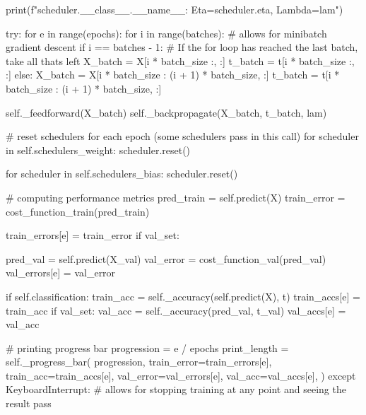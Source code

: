 \documentclass[%
oneside,                 %
final,                   %
10pt]{article}
\begin{document}
        print(f"{scheduler.__class__.__name__}: Eta={scheduler.eta}, Lambda={lam}")

        try:
            for e in range(epochs):
                for i in range(batches):
                    # allows for minibatch gradient descent
                    if i == batches - 1:
                        # If the for loop has reached the last batch, take all thats left
                        X_batch = X[i * batch_size :, :]
                        t_batch = t[i * batch_size :, :]
                    else:
                        X_batch = X[i * batch_size : (i + 1) * batch_size, :]
                        t_batch = t[i * batch_size : (i + 1) * batch_size, :]

                    self._feedforward(X_batch)
                    self._backpropagate(X_batch, t_batch, lam)

                # reset schedulers for each epoch (some schedulers pass in this call)
                for scheduler in self.schedulers_weight:
                    scheduler.reset()

                for scheduler in self.schedulers_bias:
                    scheduler.reset()

                # computing performance metrics
                pred_train = self.predict(X)
                train_error = cost_function_train(pred_train)

                train_errors[e] = train_error
                if val_set:
                    
                    pred_val = self.predict(X_val)
                    val_error = cost_function_val(pred_val)
                    val_errors[e] = val_error

                if self.classification:
                    train_acc = self._accuracy(self.predict(X), t)
                    train_accs[e] = train_acc
                    if val_set:
                        val_acc = self._accuracy(pred_val, t_val)
                        val_accs[e] = val_acc

                # printing progress bar
                progression = e / epochs
                print_length = self._progress_bar(
                    progression,
                    train_error=train_errors[e],
                    train_acc=train_accs[e],
                    val_error=val_errors[e],
                    val_acc=val_accs[e],
                )
        except KeyboardInterrupt:
            # allows for stopping training at any point and seeing the result
            pass
\end{document}
